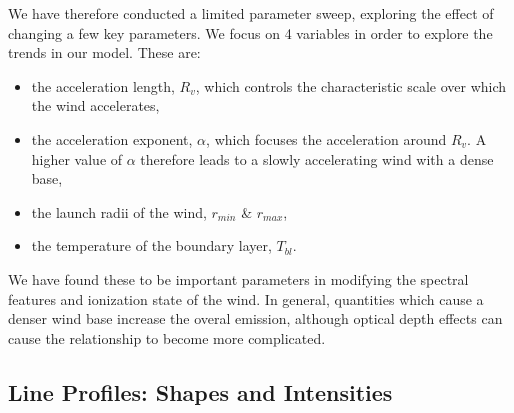 \documentclass[preprint, a4paper, 11pt]{aastex}
\begin{document}
We have therefore conducted a limited parameter 
sweep, exploring the effect of changing a few key parameters.  We focus on 
4 variables in order to explore the trends in our model. These are:

\begin{itemize}
 	\item the acceleration length, $R_v$, which controls the characteristic scale
 	over which the wind accelerates,
 	\item the acceleration exponent, $\alpha$, which focuses the acceleration
 	around $R_v$. A higher value of $\alpha$ therefore leads to a slowly accelerating 
 	wind with a dense base,
 	\item the launch radii of the wind, $r_{min}$ \& $r_{max}$,
 	\item the temperature of the boundary layer, $T_{bl}$.
 \end{itemize} 

We have found these to be important parameters in modifying 
the spectral features and ionization state of the wind.
In general, quantities which cause a denser wind base increase
the overal emission, although optical depth effects can cause 
the relationship to become more complicated. 



\subsection{Line Profiles: Shapes and Intensities}



\end{document}
